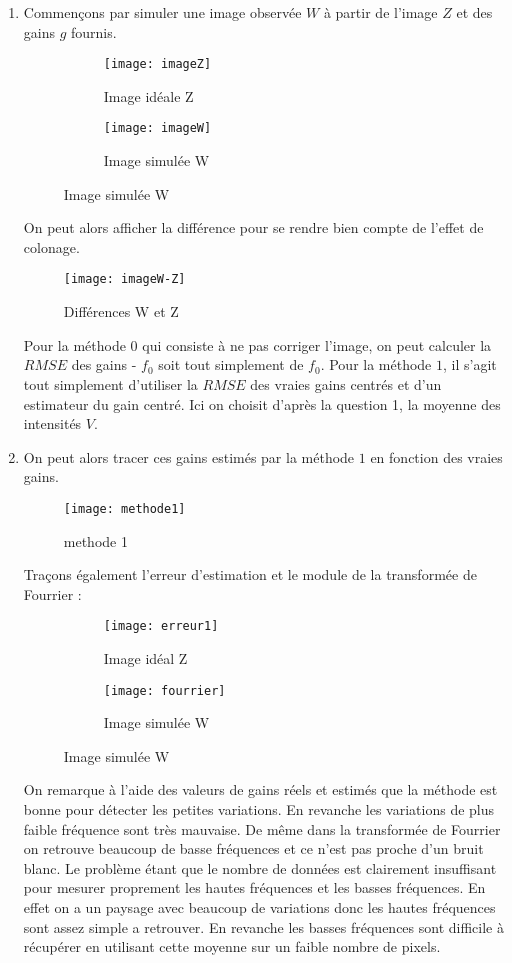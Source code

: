 \documentclass[12pt,a4paper,titlepage]{article}
\begin{document}
\begin{enumerate}
	\item{Commençons par simuler une image observée $W$ à partir de l'image $Z$ et des gains $g$ fournis.
	\begin{figure}[H]
     		\centering
    		\begin{subfigure}[H]{0.4\textwidth}
         		\centering
         		\texttt{[image: imageZ]}
         		\caption{Image idéale Z}
    		\end{subfigure}
     		\hfill
    	 	\begin{subfigure}[H]{0.4\textwidth}
         		\centering
         		\texttt{[image: imageW]}
         		\caption{Image simulée W}
     		\end{subfigure}
	\end{figure}
	On peut alors afficher la différence pour se rendre bien compte de l'effet de colonage.
	\begin{figure}[H]
    		\texttt{[image: imageW-Z]}
    		\centering
		\caption{Différences W et Z}
	\end{figure}
	Pour la méthode $0$ qui consiste à ne pas corriger l'image, on peut calculer la $RMSE$ des gains - $f_0$ soit tout simplement de $f_0$. Pour la méthode $1$, il s'agit tout simplement d'utiliser la $RMSE$ des vraies gains centrés et d'un estimateur du gain centré. Ici on choisit d'après la question 1, la moyenne des intensités $V$.
	}
	\item{On peut alors tracer ces gains estimés par la méthode $1$ en fonction des vraies gains.
	\begin{figure}[H]
    		\texttt{[image: methode1]}
    		\centering
		\caption{methode 1}
	\end{figure}
	Traçons également l'erreur d'estimation et le module de la transformée de Fourrier :
	\begin{figure}[H]
     		\centering
    		\begin{subfigure}[H]{0.45\textwidth}
         		\centering
         		\texttt{[image: erreur1]}
         		\caption{Image idéal Z}
    		\end{subfigure}
     		\hfill
    	 	\begin{subfigure}[H]{0.45\textwidth}
         		\centering
         		\texttt{[image: fourrier]}
         		\caption{Image simulée W}
     		\end{subfigure}
	\end{figure}
	On remarque à l'aide des valeurs de gains réels et estimés que la méthode est bonne pour détecter les petites variations. En revanche les variations de plus faible fréquence sont très mauvaise. De même dans la transformée de Fourrier on retrouve beaucoup de basse fréquences et ce n'est pas proche d'un bruit blanc. Le problème étant que le nombre de données est clairement insuffisant pour mesurer proprement les hautes fréquences et les basses fréquences. En effet on a un paysage avec beaucoup de variations donc les hautes fréquences sont assez simple a retrouver. En revanche les basses fréquences sont difficile à récupérer en utilisant cette moyenne sur un faible nombre de pixels.
}
\end{enumerate}
\end{document}
